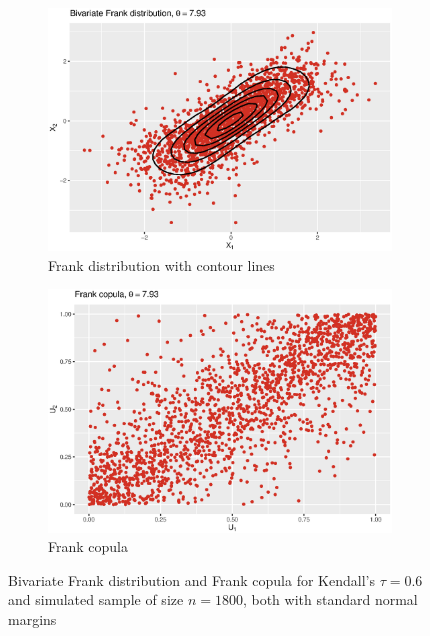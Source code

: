  \begin{figure}[H]
\centering
\begin{subfigure}{.45\textwidth}
  \centering
  \includegraphics[width=\linewidth]{figures/bivariate_frank.eps}
  \caption{Frank distribution with contour lines}
  \label{fig:bivariate_frank}
\end{subfigure}
\begin{subfigure}{.45\textwidth}
  \centering
  \includegraphics[width=\linewidth]{figures/frank_copula.eps}
  \caption{Frank copula}
  \label{fig:frank_copula}
\end{subfigure}
\caption{Bivariate Frank distribution and Frank copula for Kendall's $\tau = 0.6$ and simulated sample of size $n = 1800$, both with standard normal margins}
\label{fig:frank_plots}
\end{figure}





